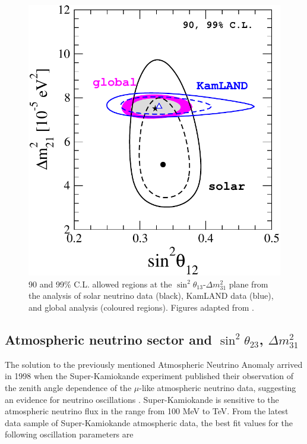 \documentclass[english]{article}
\begin{document}
    \begin{figure}[!hbt]
		\begin{center}
        \centering
        \captionsetup{justification=centering}
		\includegraphics[scale=0.5]{sol-sector-sq12-mq21.pdf}
		\caption{90 and 99\% C.L. allowed regions at the $\sin^{2}{\theta_{13}}$-$\Delta{m^{2}_{31}}$ plane from the analysis of solar neutrino data (black), KamLAND data (blue), and global analysis (coloured regions). Figures adapted from \cite{salas2018}.}
		\label{fig:sol-sector-sq12-mq21}
		\end{center}
	\end{figure}

\subsection{Atmospheric neutrino sector and $\sin^{2}{\theta_{23}}$, $\Delta{m^{2}_{31}}$}
	
    The solution to the previously mentioned Atmospheric Neutrino Anomaly arrived in 1998 when the Super-Kamiokande experiment published their observation of the zenith angle dependence of the $\mu$-like atmospheric neutrino data, suggesting an evidence for neutrino oscillations \cite{superk}. Super-Kamiokande is sensitive to the atmospheric neutrino flux in the range from 100 MeV to TeV. From the latest data sample of Super-Kamiokande atmospheric data, the best fit values for the following oscillation parameters are \cite{superk2017} \\
    
\end{document}
